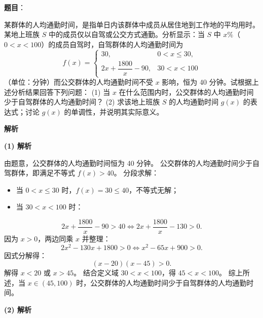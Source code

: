 \begin{answer}

\textbf{题目}：

某群体的人均通勤时间，是指单日内该群体中成员从居住地到工作地的平均用时。某地上班族 $S$ 中的成员仅以自驾或公交方式通勤。分析显示：当 $S$ 中 $x\%$（$0 < x < 100$）的成员自驾时，自驾群体的人均通勤时间为
\nopagebreak[4]
\[f(x) = \begin{cases} 30, & 0 < x \le 30, \\ 2x + \dfrac{1800}{x} - 90, & 30 < x < 100 \end{cases}\]
（单位：分钟）而公交群体的人均通勤时间不受 $x$ 影响，恒为 40 分钟。试根据上述分析结果回答下列问题：
(1) 当 $x$ 在什么范围内时，公交群体的人均通勤时间少于自驾群体的人均通勤时间？
(2) 求该地上班族 $S$ 的人均通勤时间 $g(x)$ 的表达式；讨论 $g(x)$ 的单调性，并说明其实际意义。

\textbf{解析}

\textbf{(1) 解析}

由题意，公交群体的人均通勤时间恒为 40 分钟。
公交群体的人均通勤时间少于自驾群体，即满足不等式 $f(x) > 40$。
分段求解：
\begin{itemize}
\item 当 $0 < x \le 30$ 时，$f(x) = 30 \le 40$，不等式无解；
\item 当 $30 < x < 100$ 时：
\end{itemize}
\nopagebreak[4]
\[2x + \frac{1800}{x} - 90 > 40 \iff 2x + \frac{1800}{x} - 130 > 0.\]
因为 $x > 0$，两边同乘 $x$ 并整理：
\nopagebreak[4]
\[2x^2 - 130x + 1800 > 0 \iff x^2 - 65x + 900 > 0.\]
因式分解得：
\nopagebreak[4]
\[(x - 20)(x - 45) > 0.\]
解得 $x < 20$ 或 $x > 45$。
结合定义域 $30 < x < 100$，得 $45 < x < 100$。
综上所述，当 $x \in (45, 100)$ 时，公交群体的人均通勤时间少于自驾群体的人均通勤时间。

\textbf{(2) 解析}


\end{answer}

